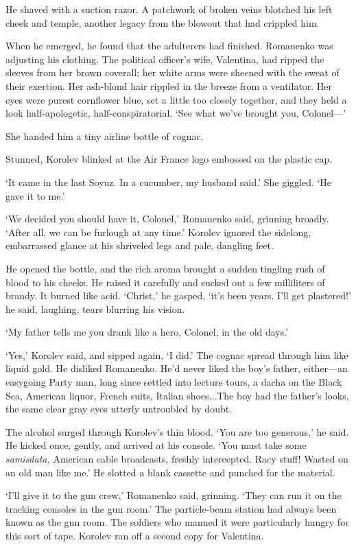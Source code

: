 He shaved with a suction razor. A patchwork of broken veins blotched his left cheek and temple, another legacy from the blowout that had crippled him.

When he emerged, he found that the adulterers had finished. Romanenko was adjusting his clothing. The political officer's wife, Valentina, had ripped the sleeves from her brown coverall; her white arms were sheened with the sweat of their exertion. Her ash-blond hair rippled in the breeze from a ventilator. Her eyes were purest cornflower blue, set a little too closely together, and they held a look half-apologetic, half-conspiratorial. `See what we've brought you, Colonel---'

She handed him a tiny airline bottle of cognac.

Stunned, Korolev blinked at the Air France logo embossed on the plastic cap.

`It came in the last Soyuz. In a cucumber, my husband said.' She giggled. `He gave it to me.'

`We decided you should have it, Colonel,' Romanenko said, grinning broadly. `After all, we can be furlough at any time.' Korolev ignored the sidelong, embarrassed glance at his shriveled legs and pale, dangling feet.

He opened the bottle, and the rich aroma brought a sudden tingling rush of blood to his cheeks. He raised it carefully and sucked out a few milliliters of brandy. It burned like acid. `Christ,' he gasped, `it's been years. I'll get plastered!' he said, laughing, tears blurring his vision.

`My father tells me you drank like a hero, Colonel, in the old days.'

`Yes,' Korolev said, and sipped again, `I did.' The cognac spread through him like liquid gold. He disliked Romanenko. He'd never liked the boy's father, either---an easygoing Party man, long since settled into lecture tours, a dacha on the Black Sea, American liquor, French suits, Italian shoes...The boy had the father's looks, the same clear gray eyes utterly untroubled by doubt.

The alcohol surged through Korolev's thin blood. `You are too generous,' he said. He kicked once, gently, and arrived at his console. `You must take some \textit{samisdata,} American cable broadcasts, freshly intercepted. Racy stuff! Wasted on an old man like me.' He slotted a blank cassette and punched for the material.

`I'll give it to the gun crew,' Romanenko said, grinning. `They can run it on the tracking consoles in the gun room.' The particle-beam station had always been known as the gun room. The soldiers who manned it were particularly hungry for this sort of tape. Korolev ran off a second copy for Valentina.

